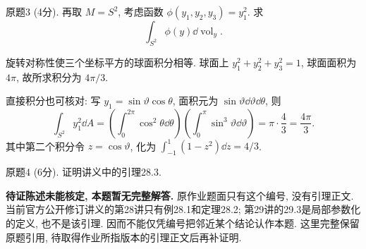 \par{}
\begin{exercise}\label{ps:9-3}
原题3 (4分). 再取 $M=S^2$, 考虑函数 $\phi(y_1,y_2,y_3)=y_1^2$. 求
\[
 \int_{S^2}\phi(y)\dd\operatorname{vol}_y.
\]
\end{exercise}
\begin{solution}
旋转对称性使三个坐标平方的球面积分相等. 球面上 $y_1^2+y_2^2+y_3^2=1$, 球面面积为 $4\pi$, 故所求积分为 $4\pi/3$.

直接积分也可核对: 写 $y_1=\sin\vartheta\cos\theta$, 面积元为 $\sin\vartheta\dd\vartheta\dd\theta$, 则
\[
 \int_{S^2}y_1^2\dd A
 =\left(\int_0^{2\pi}\cos^2\theta\dd\theta\right)
 \left(\int_0^\pi\sin^3\vartheta\dd\vartheta\right)
 =\pi\cdot\frac43=\frac{4\pi}3.
\]
其中第二个积分令 $z=\cos\vartheta$, 化为 $\int_{-1}^1(1-z^2)\dd z=4/3$.
\end{solution}

\par{}
\begin{exercise}\label{ps:9-4}
原题4 (6分). 证明讲义中的引理28.3.
\end{exercise}
\begin{remark}
\textbf{待证陈述未能核定, 本题暂无完整解答.} 原作业题面只有这个编号, 没有引理正文. 当前官方公开修订讲义的第28讲只有例28.1和定理28.2; 第29讲的29.3是局部参数化的定义, 也不是该引理. 因而不能仅凭编号把邻近某个结论认作本题. 这里完整保留原题引用, 待取得作业所指版本的引理正文后再补证明.
\end{remark}
